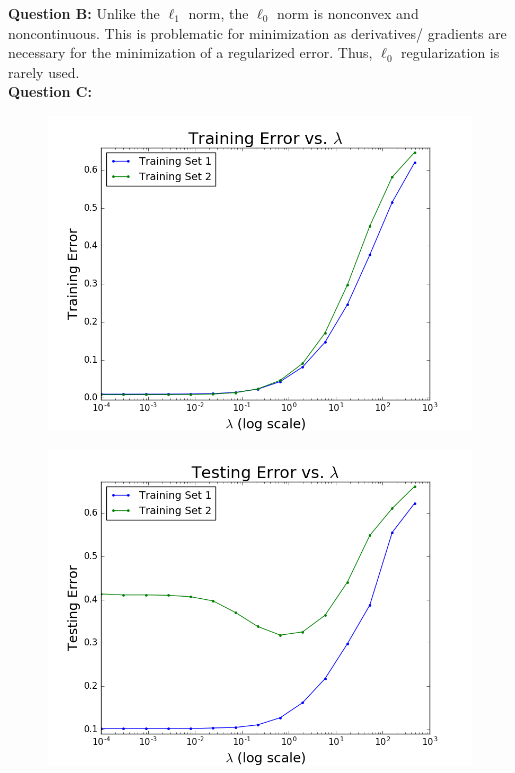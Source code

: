 \documentclass[12 pt]{article}
\begin{document}
	\noindent\textbf{Question B:} Unlike the $\ell_1$ norm, the $\ell_0$ norm is nonconvex and noncontinuous. This is problematic for minimization as derivatives/ gradients are necessary for the minimization of a regularized error. Thus, $\ell_0$ regularization is rarely used. \\
	
	\noindent\textbf{Question C:}  \\
	\begin{figure}[H]
	\includegraphics[width=12cm]{TrainingError2C}
	\end{figure}	

	\begin{figure}[H]
	\includegraphics[width=12cm]{TestingError2C}
	\end{figure}
\end{document}
